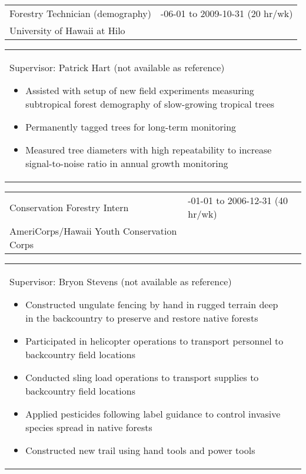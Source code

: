 \documentclass[10pt,english]{article}
\providecommand{\tabularnewline}{\\}
\begin{document}
\renewcommand{\arraystretch}{1.2}
\begin{tabularx}{\textwidth}{@{}>{\raggedright}p{3.75in} >{\raggedleft}X@{}}
Forestry Technician (demography) & 2009-06-01 to 2009-10-31 (20 hr/wk) \tabularnewline
University of Hawaii at Hilo & \tabularnewline
\end{tabularx}

\renewcommand{\arraystretch}{1.2}
\begin{tabularx}{\textwidth}{@{}>{\raggedright}p{6.25in} >{\raggedleft}X@{}}
\addtolength{\leftskip}{5ex}Supervisor: Patrick Hart (not available as reference)
\begin{itemize}
\itemsep0em
\item{Assisted with setup of new field experiments measuring subtropical forest demography of slow-growing tropical trees}
\item{Permanently tagged trees for long-term monitoring}
\item{Measured tree diameters with high repeatability to increase signal-to-noise ratio in annual growth monitoring}
\end{itemize}
\end{tabularx}

\renewcommand{\arraystretch}{1.2}
\begin{tabularx}{\textwidth}{@{}>{\raggedright}p{3.75in} >{\raggedleft}X@{}}
Conservation Forestry Intern & 2006-01-01 to 2006-12-31 (40 hr/wk) \tabularnewline
AmeriCorps/Hawaii Youth Conservation Corps & \tabularnewline
\end{tabularx}

\renewcommand{\arraystretch}{1.2}
\begin{tabularx}{\textwidth}{@{}>{\raggedright}p{6.25in} >{\raggedleft}X@{}}
\addtolength{\leftskip}{5ex}Supervisor: Bryon Stevens (not available as reference)
\begin{itemize}
\itemsep0em
\item{Constructed ungulate fencing by hand in rugged terrain deep in the backcountry to preserve and restore native forests}
\item{Participated in helicopter operations to transport personnel to backcountry field locations}
\item{Conducted sling load operations to transport supplies to backcountry field locations}
\item{Applied pesticides following label guidance to control invasive species spread in native forests} 
\item{Constructed new trail using hand tools and power tools}
\end{itemize}
\end{tabularx}
\end{document}
